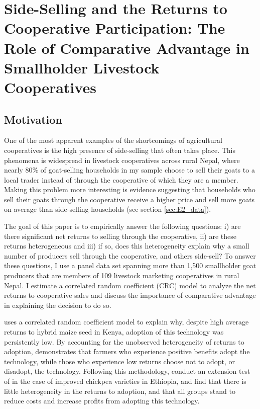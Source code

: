 \documentclass[11pt]{article}
\begin{document}
\newpage
\singlespacing

\section{Side-Selling and the Returns to Cooperative Participation: The Role of Comparative Advantage in Smallholder Livestock Cooperatives} \label{sec:E2}
\doublespacing

\subsection{Motivation} \label{sec:E2_motivation}
One of the most apparent examples of the shortcomings of agricultural cooperatives is the high presence of side-selling that often takes place. This phenomena is widespread in livestock cooperatives across rural Nepal, where nearly 80\% of goat-selling households in my sample choose to sell their goats to a local trader instead of through the cooperative of which they are a member. Making this problem more interesting is evidence suggesting that households who sell their goats through the cooperative receive a higher price and sell more goats on average than side-selling households (see section \ref{sec:E2_data}).

The goal of this paper is to empirically answer the following questions: i) are there significant net returns to selling through the cooperative, ii) are these returns heterogeneous and iii) if so, does this heterogeneity explain why a small number of producers sell through the cooperative, and others side-sell? To answer these questions, I use a panel data set spanning more than 1,500 smallholder goat producers that are members of 109 livestock marketing cooperatives in rural Nepal. I estimate a correlated random coefficient (CRC) model to analyze the net returns to cooperative sales and discuss the importance of comparative advantage in explaining the decision to do so. 

\citet{suri11} uses a correlated random coefficient model to explain why, despite high average returns to hybrid maize seed in Kenya, adoption of this technology was persistently low. By accounting for the unobserved heterogeneity of returns to adoption, \citet{suri11} demonstrates that farmers who experience positive benefits adopt the technology, while those who experience low returns choose not to adopt, or disadopt, the technology. Following this methodology, \citet{michler-et.al.18} conduct an extension test of \citet{suri11} in the case of improved chickpea varieties in Ethiopia, and find that there is little heterogeneity in the returns to adoption, and that all groups stand to reduce costs and increase profits from adopting this technology. 
\end{document}
